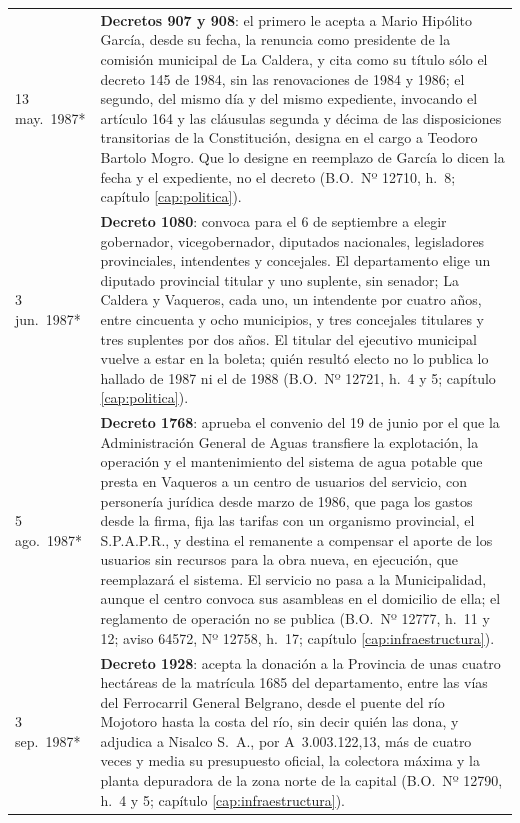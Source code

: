 \begin{longtable}{@{}p{2.7cm}p{10.3cm}@{}}
13 may.\ 1987* & \textbf{Decretos 907 y 908}: el primero le acepta a Mario Hipólito García, desde su fecha, la renuncia como presidente de la comisión municipal de La Caldera, y cita como su título sólo el decreto 145 de 1984, sin las renovaciones de 1984 y 1986; el segundo, del mismo día y del mismo expediente, invocando el artículo 164 y las cláusulas segunda y décima de las disposiciones transitorias de la Constitución, designa en el cargo a Teodoro Bartolo Mogro. Que lo designe en reemplazo de García lo dicen la fecha y el expediente, no el decreto (B.O.\ Nº 12710, h.\ 8; capítulo \ref{cap:politica}). \\
3 jun.\ 1987* & \textbf{Decreto 1080}: convoca para el 6 de septiembre a elegir gobernador, vicegobernador, diputados nacionales, legisladores provinciales, intendentes y concejales. El departamento elige un diputado provincial titular y uno suplente, sin senador; La Caldera y Vaqueros, cada uno, un intendente por cuatro años, entre cincuenta y ocho municipios, y tres concejales titulares y tres suplentes por dos años. El titular del ejecutivo municipal vuelve a estar en la boleta; quién resultó electo no lo publica lo hallado de 1987 ni el de 1988 (B.O.\ Nº 12721, h.\ 4 y 5; capítulo \ref{cap:politica}). \\
5 ago.\ 1987* & \textbf{Decreto 1768}: aprueba el convenio del 19 de junio por el que la Administración General de Aguas transfiere la explotación, la operación y el mantenimiento del sistema de agua potable que presta en Vaqueros a un centro de usuarios del servicio, con personería jurídica desde marzo de 1986, que paga los gastos desde la firma, fija las tarifas con un organismo provincial, el S.P.A.P.R., y destina el remanente a compensar el aporte de los usuarios sin recursos para la obra nueva, en ejecución, que reemplazará el sistema. El servicio no pasa a la Municipalidad, aunque el centro convoca sus asambleas en el domicilio de ella; el reglamento de operación no se publica (B.O.\ Nº 12777, h.\ 11 y 12; aviso 64572, Nº 12758, h.\ 17; capítulo \ref{cap:infraestructura}). \\
3 sep.\ 1987* & \textbf{Decreto 1928}: acepta la donación a la Provincia de unas cuatro hectáreas de la matrícula 1685 del departamento, entre las vías del Ferrocarril General Belgrano, desde el puente del río Mojotoro hasta la costa del río, sin decir quién las dona, y adjudica a Nisalco S.\ A., por A~3.003.122,13, más de cuatro veces y media su presupuesto oficial, la colectora máxima y la planta depuradora de la zona norte de la capital (B.O.\ Nº 12790, h.\ 4 y 5; capítulo \ref{cap:infraestructura}). \\

\end{longtable}
